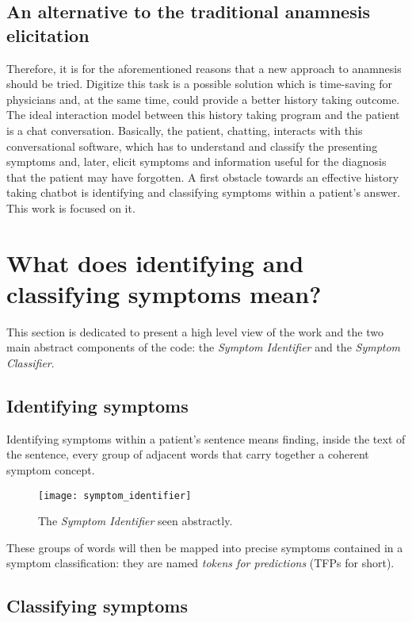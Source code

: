 \subsection{An alternative to the traditional anamnesis elicitation}

Therefore, it is for the aforementioned reasons that a new approach to anamnesis should be tried. Digitize this task is a possible solution which is time-saving for physicians and, at the same time, could provide a better history taking outcome. The ideal interaction model between this history taking program and the patient is a chat conversation. Basically, the patient, chatting, interacts with this conversational software, which has to understand and classify the presenting symptoms and, later, elicit symptoms and information useful for the diagnosis that the patient may have forgotten. A first obstacle towards an effective history taking chatbot is identifying and classifying symptoms within a patient’s answer. This work is focused on it.

\section{What does identifying and classifying symptoms mean?}

This section is dedicated to present a high level view of the work and the two main abstract components of the code: the \textit{Symptom Identifier} and the \textit{Symptom Classifier}. 

\label{sec:identifying_classifying}
\subsection{Identifying symptoms}

Identifying symptoms within a patient's sentence means finding, inside the text of the sentence, every group of adjacent words that carry together a coherent symptom concept.

\begin{figure}[h]
\centering
\texttt{[image: symptom\_identifier]}
\caption{The \textit{Symptom Identifier} seen abstractly.}
\medskip
\end{figure}
\newpage
These groups of words will then be mapped into precise symptoms contained in a symptom classification: they are named \textit{tokens for predictions} (TFPs for short).

\subsection{Classifying symptoms}
\label{sec:cla_symp}

